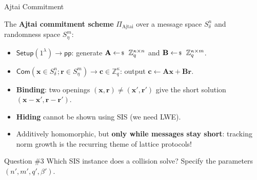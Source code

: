 \documentclass{zkdl-presentation-template}
\begin{document}
    \begin{frame}{Ajtai Commitment}
        \begin{definition}
            The \textbf{Ajtai commitment scheme} $\Pi_{\text{Ajtai}}$ over a message space $S_{\delta}^n$ and randomness space $S_{\eta}^m$:
            \begin{itemize}
                \item $\mathsf{Setup}(1^{\lambda}) \to \mathsf{pp}$: generate $\mathbf{A} \leftarrowS \mathbb{Z}_q^{\kappa \times n}$ and $\mathbf{B} \leftarrowS \mathbb{Z}_q^{\kappa \times m}$.
                \item $\mathsf{Com}(\mathbf{x} \in S_{\delta}^n; \mathbf{r} \in S_{\eta}^m) \to \mathbf{c} \in \mathbb{Z}_q^{\kappa}$: output $\mathbf{c} \gets \mathbf{Ax} + \mathbf{Br}$.
            \end{itemize}
        \end{definition}
        \pause

        \begin{itemize}
            \item \textbf{Binding}: two openings $(\mathbf{x},\mathbf{r}) \neq (\mathbf{x}',\mathbf{r}')$ give the short solution $(\mathbf{x}-\mathbf{x}',\mathbf{r}-\mathbf{r}')$.
            \item \textbf{Hiding} cannot be shown using SIS (we need LWE).
            \item Additively homomorphic, but \textbf{only while messages stay short}: tracking norm growth is the recurring theme of lattice protocols!
        \end{itemize}
        \pause

        \begin{questionblock}{Question \#3}
            Which SIS instance does a collision solve? Specify the parameters $(n',m',q',\beta')$.
        \end{questionblock}
    \end{frame}
\end{document}

